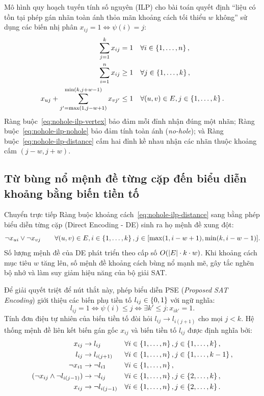 Mô hình quy hoạch tuyến tính số nguyên (ILP) cho bài toán quyết định ``liệu có tồn tại phép gán nhãn toàn ánh thỏa mãn khoảng cách tối thiểu \(w\) không'' sử dụng các biến nhị phân \(x_{ij} = 1 \iff \psi(i) = j\):
\begin{align}
  \sum_{j=1}^k x_{ij} &= 1 && \forall i\in\left\{1,\ldots,n\right\}, \label{eq:nohole-ilp-vertex}\\
  \sum_{i=1}^n x_{ij} &\ge 1 && \forall j\in\left\{1,\ldots,k\right\}, \label{eq:nohole-ilp-nohole}\\
  x_{uj} + \sum_{j'=\max(1, j-w+1)}^{\min(k, j+w-1)} x_{vj'} &\le 1 && \forall (u,v)\in E, j\in\left\{1,\ldots,k\right\}. \label{eq:nohole-ilp-distance}
\end{align}
Ràng buộc~\eqref{eq:nohole-ilp-vertex} bảo đảm mỗi đỉnh nhận đúng một nhãn; Ràng buộc~\eqref{eq:nohole-ilp-nohole} bảo đảm tính toàn ánh (\emph{no-hole}); và Ràng buộc~\eqref{eq:nohole-ilp-distance} cấm hai đỉnh kề nhau nhận các nhãn thuộc khoảng cấm \((j-w, j+w)\).

\subsection{Từ bùng nổ mệnh đề từng cặp đến biểu diễn khoảng bằng biến tiền tố}

Chuyển trực tiếp Ràng buộc khoảng cách~\eqref{eq:nohole-ilp-distance} sang \CNF bằng phép biểu diễn từng cặp (Direct Encoding - DE) sinh ra họ mệnh đề xung đột:
\begin{equation}
  \neg x_{ui} \lor \neg x_{vj} \qquad \forall (u,v)\in E, i\in\left\{1,\dots,k\right\}, j\in [\max(1,i-w+1),\min(k,i-w-1)].
  \label{eq:nohole-direct-cnf}
\end{equation}
Số lượng mệnh đề của DE phát triển theo cấp số \(O(\lvert E\rvert\cdot k\cdot w)\). Khi khoảng cách mục tiêu \(w\) tăng lên, số mệnh đề khoảng cách bùng nổ mạnh mẽ, gây tắc nghẽn bộ nhớ và làm suy giảm hiệu năng của bộ giải SAT.

Để giải quyết triệt để nút thắt này, phép biểu diễn \mbox{\textnormal{\textsc{PSE}}} (\emph{Proposed SAT Encoding}) \parencite{hai2026nohole} giới thiệu các biến phụ tiền tố \(l_{ij} \in \left\{0,1\right\}\) với ngữ nghĩa:
\[
  l_{ij} = 1 \iff \psi(i) \le j \iff \exists k' \le j : x_{ik'} = 1.
\]
Tính đơn điệu tự nhiên của biến tiền tố đòi hỏi \(l_{ij} \to l_{i(j+1)}\) cho mọi \(j < k\). Hệ thống mệnh đề liên kết biến gán gốc \(x_{ij}\) và biến tiền tố \(l_{ij}\) được định nghĩa bởi:
\begin{align}
  x_{ij} &\to l_{ij} && \forall i\in\left\{1,\ldots,n\right\}, j\in\left\{1,\ldots,k\right\}, \label{eq:nohole-link-1}\\
  l_{ij} &\to l_{i(j+1)} && \forall i\in\left\{1,\ldots,n\right\}, j\in\left\{1,\ldots,k-1\right\}, \label{eq:nohole-link-2}\\
  \neg x_{i1} &\to \neg l_{i1} && \forall i\in\left\{1,\ldots,n\right\}, \label{eq:nohole-link-3}\\
  (\neg x_{ij} \land \neg l_{i(j-1)}) &\to \neg l_{ij} && \forall i\in\left\{1,\ldots,n\right\}, j\in\left\{2,\ldots,k\right\}, \label{eq:nohole-link-4}\\
  x_{ij} &\to \neg l_{i(j-1)} && \forall i\in\left\{1,\ldots,n\right\}, j\in\left\{2,\ldots,k\right\}. \label{eq:nohole-link-5}
\end{align}

